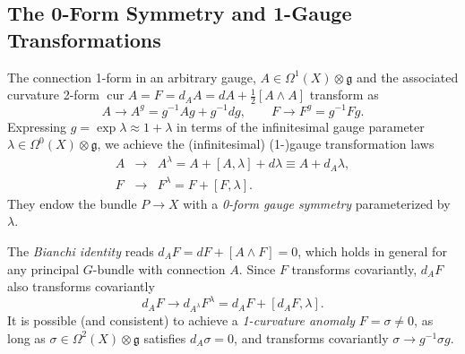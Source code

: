 \documentclass[onecolumn]{article}
\theoremstyle{theorem}
\theoremstyle{remark}
\theoremstyle{example}
\theoremstyle{definition}
\numberwithin{equation}{section}
\begin{document}
\subsection{The 0-Form Symmetry and 1-Gauge Transformations} The connection 1-form in an arbitrary gauge, $A\in\Omega^1(X)\otimes\mathfrak{g}$ and the associated curvature 2-form $\operatorname{cur}A=F=d_AA=dA+\frac{1}{2}[A\wedge A]$ transform as
\begin{equation}\label{1-gauge}
    A\rightarrow A^g=g^{-1}Ag + g^{-1}dg,\qquad F\rightarrow F^g=g^{-1}Fg.
\end{equation}
{Expressing} $g = \exp \lambda \approx 1+\lambda$ in terms of the infinitesimal gauge parameter $\lambda\in\Omega^0(X)\otimes\mathfrak{g}$, we achieve the (infinitesimal) {(1-)gauge transformation laws}
\begin{eqnarray}
A&\rightarrow& A^\lambda = A + [A,\lambda] + d\lambda \equiv A + d_A\lambda, \nonumber\\
F&\rightarrow& F^\lambda = F + [F,\lambda].\nonumber
\end{eqnarray} 
{They} endow the bundle $P\rightarrow X$ with a \textit{{0-form gauge symmetry}} parameterized by $\lambda$. 


The {\it {Bianchi identity}} reads $d_AF = dF + [A\wedge F]=0$, which holds in general for any principal $G$-bundle with connection $A$. Since $F$ transforms covariantly, $d_AF$ also transforms  covariantly
\begin{equation}
   d_AF\rightarrow d_{A^\lambda}F^\lambda = d_AF + [d_AF,\lambda].\nonumber
\end{equation} 
{It} is possible (and consistent) to achieve a {\it {1-curvature anomaly}} $F=\sigma\neq0$, as long as $\sigma\in \Omega^2(X)\otimes\mathfrak{g}$ satisfies $d_A\sigma=0$, and transforms covariantly $\sigma\rightarrow g^{-1}\sigma g$. 

\end{document}
